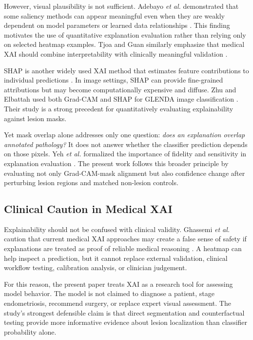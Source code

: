 However, visual plausibility is not sufficient. Adebayo \emph{et al.} demonstrated that some saliency methods can appear meaningful even when they are weakly dependent on model parameters or learned data relationships \cite{adebayo2018sanity}. This finding motivates the use of quantitative explanation evaluation rather than relying only on selected heatmap examples. Tjoa and Guan similarly emphasize that medical XAI should combine interpretability with clinically meaningful validation \cite{tjoa2021medicalxai}.

SHAP is another widely used XAI method that estimates feature contributions to individual predictions \cite{lundberg2017shap}. In image settings, SHAP can provide fine-grained attributions but may become computationally expensive and diffuse. Zhu and Elbattah used both Grad-CAM and SHAP for GLENDA image classification \cite{zhu2025xai}. Their study is a strong precedent for quantitatively evaluating explainability against lesion masks.

Yet mask overlap alone addresses only one question: \emph{does an explanation overlap annotated pathology?} It does not answer whether the classifier prediction depends on those pixels. Yeh \emph{et al.} formalized the importance of fidelity and sensitivity in explanation evaluation \cite{yeh2019fidelity}. The present work follows this broader principle by evaluating not only Grad-CAM-mask alignment but also confidence change after perturbing lesion regions and matched non-lesion controls.

\subsection{Clinical Caution in Medical XAI}

Explainability should not be confused with clinical validity. Ghassemi \emph{et al.} caution that current medical XAI approaches may create a false sense of safety if explanations are treated as proof of reliable medical reasoning \cite{ghassemi2021falsehope}. A heatmap can help inspect a prediction, but it cannot replace external validation, clinical workflow testing, calibration analysis, or clinician judgement.

For this reason, the present paper treats XAI as a research tool for assessing model behavior. The model is not claimed to diagnose a patient, stage endometriosis, recommend surgery, or replace expert visual assessment. The study's strongest defensible claim is that direct segmentation and counterfactual testing provide more informative evidence about lesion localization than classifier probability alone.

